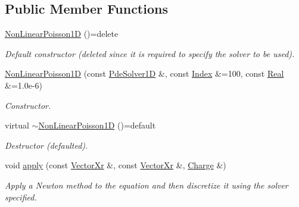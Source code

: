 \subsection*{Public Member Functions}
\begin{DoxyCompactItemize}
\item 
\hypertarget{classNonLinearPoisson1D_ad4d805d47a62331707176ad2693499f3}{\hyperlink{classNonLinearPoisson1D_ad4d805d47a62331707176ad2693499f3}{Non\-Linear\-Poisson1\-D} ()=delete}\label{classNonLinearPoisson1D_ad4d805d47a62331707176ad2693499f3}

\begin{DoxyCompactList}\small\item\em Default constructor (deleted since it is required to specify the solver to be used). \end{DoxyCompactList}\item 
\hyperlink{classNonLinearPoisson1D_ac6c77988b843e0bd9df82c97b7da7cf6}{Non\-Linear\-Poisson1\-D} (const \hyperlink{classPdeSolver1D}{Pde\-Solver1\-D} \&, const \hyperlink{typedefs_8h_a2c726f8f32697958e9d6c2afecda531d}{Index} \&=100, const \hyperlink{typedefs_8h_a060b837c3b4486ee35317744156f3da2}{Real} \&=1.\-0e-\/6)
\begin{DoxyCompactList}\small\item\em Constructor. \end{DoxyCompactList}\item 
\hypertarget{classNonLinearPoisson1D_a1452123e4787361491d2f54c46794df9}{virtual \hyperlink{classNonLinearPoisson1D_a1452123e4787361491d2f54c46794df9}{$\sim$\-Non\-Linear\-Poisson1\-D} ()=default}\label{classNonLinearPoisson1D_a1452123e4787361491d2f54c46794df9}

\begin{DoxyCompactList}\small\item\em Destructor (defaulted). \end{DoxyCompactList}\item 
void \hyperlink{classNonLinearPoisson1D_a54768475940b34c5e39583a3635cf63b}{apply} (const \hyperlink{typedefs_8h_aae6cee78ed9cd8f234ed8cb48682548a}{Vector\-Xr} \&, const \hyperlink{typedefs_8h_aae6cee78ed9cd8f234ed8cb48682548a}{Vector\-Xr} \&, \hyperlink{classCharge}{Charge} \&)
\begin{DoxyCompactList}\small\item\em Apply a Newton method to the equation and then discretize it using the solver specified. \end{DoxyCompactList}\end{DoxyCompactItemize}
